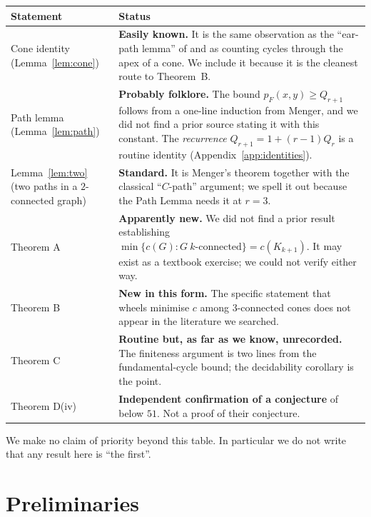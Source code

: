 \documentclass[11pt,a4paper]{article}
\theoremstyle{definition}
\newcommand{\cKn}[1]{c(K_{#1})}
\begin{document}
\begin{center}
\small
\begin{longtable}{@{}p{}p{}@{}}
\toprule
\textbf{Statement} & \textbf{Status}\\
\midrule
Cone identity (Lemma~\ref{lem:cone}) & \textbf{Easily known.}  It is the
same observation as the ``ear-path lemma'' of \cite{mcculloch2026} and as
counting cycles through the apex of a cone.  We include it because it is the
cleanest route to Theorem~B.\\
\addlinespace
Path lemma (Lemma~\ref{lem:path}) & \textbf{Probably folklore.}  The bound
$p_F(x,y)\ge Q_{r+1}$ follows from a one-line induction from Menger, and we
did not find a prior source stating it with this constant.  The
\emph{recurrence} $Q_{r+1}=1+(r-1)Q_r$ is a routine identity
(Appendix~\ref{app:identities}).\\
\addlinespace
Lemma~\ref{lem:two} (two paths in a $2$-connected graph) &
\textbf{Standard.}  It is Menger's theorem together with the classical
``$C$-path'' argument; we spell it out because the Path Lemma needs it at
$r=3$.\\
\addlinespace
Theorem A & \textbf{Apparently new.}  We did not find a prior result
establishing $\min\{c(G): G\ k\text{-connected}\}=\cKn{k+1}$.  It may exist as a
textbook exercise; we could not verify either way.\\
\addlinespace
Theorem B & \textbf{New in this form.}  The specific statement that wheels
minimise $c$ among $3$-connected cones does not appear in the literature we
searched.\\
\addlinespace
Theorem C & \textbf{Routine but, as far as we know, unrecorded.}  The
finiteness argument is two lines from the fundamental-cycle bound; the
decidability corollary is the point.\\
\addlinespace
Theorem D(iv) & \textbf{Independent confirmation of a conjecture} of
\cite{mcculloch2026} below $51$.  Not a proof of their conjecture.\\
\bottomrule
\end{longtable}
\end{center}

We make no claim of priority beyond this table.  In particular we do not write
that any result here is ``the first''.

\section{Preliminaries}
\end{document}
